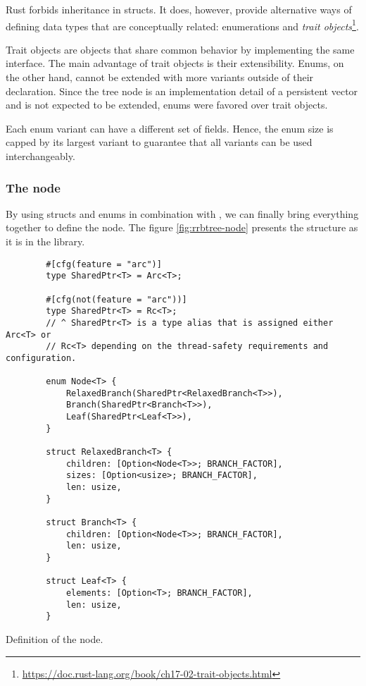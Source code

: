 Rust forbids inheritance in structs. It does, however, provide alternative ways of defining data types that are conceptually related: enumerations and \emph{trait objects}\footnote{\url{https://doc.rust-lang.org/book/ch17-02-trait-objects.html}}.

Trait objects are objects that share common behavior by implementing the same interface. The main advantage of trait objects is their extensibility. Enums, on the other hand, cannot be extended with more variants outside of their declaration. Since the tree node is an implementation detail of a persistent vector and is not expected to be extended, enums were favored over trait objects.

Each enum variant can have a different set of fields. Hence, the enum size is capped by its largest variant to guarantee that all variants can be used interchangeably.

\subsubsection*{The \rrbtree{} node}

By using structs and enums in combination with \rc{}, we can finally bring everything together to define the \rrbtree{} node. The figure \ref{fig:rrbtree-node} presents the structure as it is in the library.

\begin{listing}[!ht]

    \centering
    \begin{verbatim}
        #[cfg(feature = "arc")]
        type SharedPtr<T> = Arc<T>;

        #[cfg(not(feature = "arc"))]
        type SharedPtr<T> = Rc<T>;
        // ^ SharedPtr<T> is a type alias that is assigned either Arc<T> or
        // Rc<T> depending on the thread-safety requirements and configuration.

        enum Node<T> {
            RelaxedBranch(SharedPtr<RelaxedBranch<T>>),
            Branch(SharedPtr<Branch<T>>),
            Leaf(SharedPtr<Leaf<T>>),
        }

        struct RelaxedBranch<T> {
            children: [Option<Node<T>>; BRANCH_FACTOR],
            sizes: [Option<usize>; BRANCH_FACTOR],
            len: usize,
        }

        struct Branch<T> {
            children: [Option<Node<T>>; BRANCH_FACTOR],
            len: usize,
        }

        struct Leaf<T> {
            elements: [Option<T>; BRANCH_FACTOR],
            len: usize,
        }
    \end{verbatim}

    \caption{Definition of the \rrbtree{} node.}
    \label{fig:rrbtree-node}
\end{listing}

